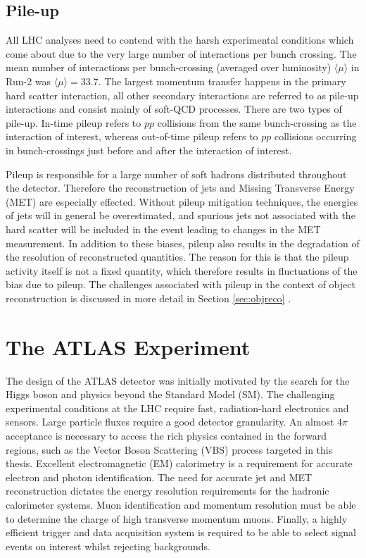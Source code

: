 \subsection{Pile-up}

All LHC analyses need to contend with the harsh experimental conditions which come about due to the very large number of interactions per bunch crossing. The mean number of interactions per bunch-crossing (averaged over luminosity) $\langle\mu\rangle$ in Run-2 was $\langle\mu\rangle = 33.7$. The largest momentum transfer happens in the primary hard scatter interaction, all other secondary interactions are referred to as pile-up interactions and consist mainly of soft-QCD processes. There are two types of pile-up. In-time pileup refers to $pp$ collisions from the same bunch-crossing as the interaction of interest, whereas out-of-time pileup refers to $pp$ collisions occurring in bunch-crossings just before and after the interaction of interest. 

Pileup is responsible for a large number of soft hadrons distributed throughout the detector. Therefore the reconstruction of jets and Missing Transverse Energy (MET) are especially effected. Without pileup mitigation techniques, the energies of jets will in general be overestimated, and spurious jets not associated with the hard scatter will be included in the event leading to changes in the MET measurement. In addition to these biases, pileup also results in the degradation of the resolution of reconstructed quantities. The reason for this is that the pileup activity itself is not a fixed quantity, which therefore results in fluctuations of the bias due to pileup. The challenges associated with pileup in the context of object reconstruction is discussed in more detail in Section \ref{sec:objreco} \cite{Buckley:PCP,LHC:pileup}.

\section{The ATLAS Experiment}
The design of the ATLAS detector was initially motivated by the search for the Higgs boson and physics beyond the Standard Model (SM). The challenging experimental conditions at the LHC require fast, radiation-hard electronics and sensors. Large particle fluxes require a good detector granularity. An almost $4\pi$ acceptance is necessary to access the rich physics contained in the forward regions, such as the Vector Boson Scattering (VBS) process targeted in this thesis. Excellent electromagnetic (EM) calorimetry is a requirement for accurate electron and photon identification. The need for accurate jet and MET reconstruction dictates the energy resolution requirements for the hadronic calorimeter systems. Muon identification and momentum resolution must be able to determine the charge of high transverse momentum muons. Finally, a highly efficient trigger and data acquisition system is required to be able to select signal events on interest whilst rejecting backgrounds. 

